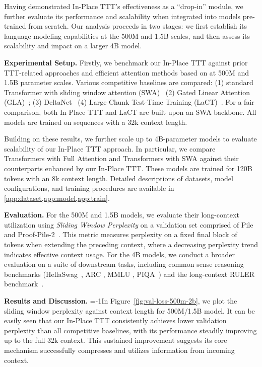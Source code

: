 Having demonstrated In-Place TTT's effectiveness as a ``drop-in'' module, we further evaluate its performance and scalability when integrated into models pre-trained from scratch. Our analysis proceeds in two stages: we first establish its language modeling capabilities at the 500M and 1.5B scales, and then assess its scalability and impact on a larger 4B model.

\textbf{Experimental Setup.}
Firstly, we benchmark our In-Place TTT against prior TTT-related approaches and efficient attention methods based on \citet{long_data_collection} at 500M and 1.5B parameter scales. Various competitive baselines are compared: (1) standard Transformer with sliding window attention (SWA)~\citep{child2019generating,beltagy2020longformer} (2) Gated Linear Attention (GLA)~\citep{yang2024gated}; (3) DeltaNet~\citep{schlag2021linear,yangparallelizing,yang2024gdn} (4) Large Chunk Test-Time Training (LaCT)~\citep{zhang2025tttdr}. For a fair comparison, both In-Place TTT and LaCT are built upon an SWA backbone. All models are trained on sequences with a 32k context length.

Building on these results, we further scale up to 4B-parameter models to evaluate scalability of our In-Place TTT approach. In particular, we compare Transformers with Full Attention and Transformers with SWA against their counterparts enhanced by our In-Place TTT. These models are trained for 120B tokens with an 8k context length. Detailed descriptions of datasets, model configurations, and training procedures are available in \cref{app:dataset,app:model,app:train}.

\textbf{Evaluation.}
 For the 500M and 1.5B models, we evaluate their long-context utilization using \textit{Sliding Window Perplexity} on a validation set comprised of Pile~\citep{gao2020pile} and Proof-Pile-2~\citep{paster2023openwebmath}. This metric measures perplexity on a fixed final block of tokens when extending the preceding context, where a decreasing perplexity trend indicates effective context usage. For the 4B models, we conduct a broader evaluation on a suite of downstream tasks, including common sense reasoning benchmarks (HellaSwag~\citep{zellers2019hellaswag}, ARC \citep{allenai:arc}, MMLU \citep{hendrycks2020measuring,hendrycks2021ethics}, PIQA~\citep{bisk2019piqa}) and the long-context RULER benchmark~\citep{hsieh2024ruler}.

\textbf{Results and Discussion.}
\looseness=-1In Figure~\ref{fig:val-loss-500m-2b}, we plot the sliding window perplexity against context length for 500M/1.5B model. It can be easily seen that our In-Place TTT consistently achieves lower validation perplexity than all competitive baselines, with its performance steadily improving up to the full 32k context. This sustained improvement suggests its core mechanism successfully compresses and utilizes information from incoming context.

